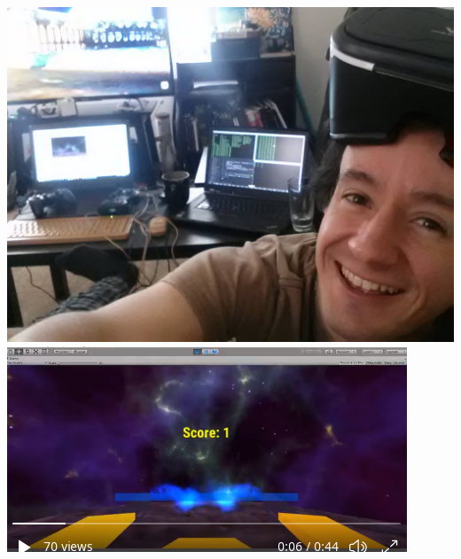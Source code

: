 \documentclass[../resume.tex]{subfiles}
\begin{document}
\noindent
\includegraphics[scale=0.12]{../fun/gator_vr.jpg}
\href{https://twitter.com/randompast/status/940575416867319808}{\includegraphics[scale=0.5]{../fun/gatorvr_tinyplanet.png}}
\end{document}
